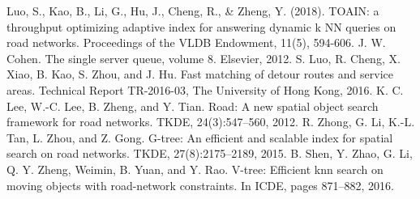 \documentclass{ML}
\begin{document}
\begin{thebibliography}{20}
     Luo, S., Kao, B., Li, G., Hu, J., Cheng, R., \& Zheng, Y. (2018). TOAIN: a throughput optimizing adaptive index for answering dynamic k NN queries on road networks. Proceedings of the VLDB Endowment, 11(5), 594-606.
     J. W. Cohen. The single server queue, volume 8. Elsevier, 2012.
    S. Luo, R. Cheng, X. Xiao, B. Kao, S. Zhou, and J. Hu. Fast
    matching of detour routes and service areas. Technical
    Report TR-2016-03, The University of Hong Kong, 2016.
    K. C. Lee, W.-C. Lee, B. Zheng, and Y. Tian. Road: A new
    spatial object search framework for road networks. TKDE,
    24(3):547–560, 2012.
    R. Zhong, G. Li, K.-L. Tan, L. Zhou, and Z. Gong. G-tree:
    An efficient and scalable index for spatial search on road
    networks. TKDE, 27(8):2175–2189, 2015.
    B. Shen, Y. Zhao, G. Li, Q. Y. Zheng, Weimin, B. Yuan, and
    Y. Rao. V-tree: Efficient knn search on moving objects with
    road-network constraints. In ICDE, pages 871–882, 2016.
\end{thebibliography}
\end{document}
